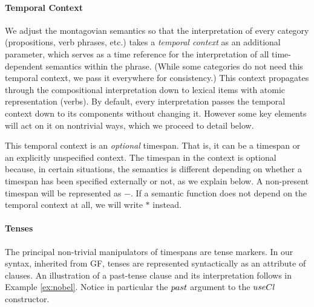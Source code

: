 \documentclass[a4paper,twoside]{article}
\begin{document}
\paragraph{Temporal Context}

We adjust the montagovian semantics so that the interpretation of
every category (propositions, verb phrases, etc.) takes a
\emph{temporal context} as an additional parameter, which serves as a time
reference for the interpretation of all time-dependent semantics
within the phrase. (While some categories do not need this temporal context, we pass it everywhere for consistency.)  This context propagates through the compositional
interpretation down to lexical items with atomic representation
(verbs). By default, every interpretation passes the temporal context
down to its components without changing it. However some key elements
will act on it on nontrivial ways, which we proceed to detail below.

This temporal context is an \emph{optional} timespan. That is, it can
be a timespan or an explicitly unspecified context.
\newcommand\nospan{\ensuremath{-}}
\newcommand\anyspan{\ensuremath{\mathbf{*}}} The timespan in the context is
optional because, in certain situations, the semantics is different
depending on whether a timespan has been specified externally or not,
as we explain below. A non-present timespan will be represented as
\nospan{}. If a semantic function does not depend on the temporal
context at all, we will write \anyspan{} instead.

\paragraph{Tenses}

\newcommand\varid[1]{\mathnormal{#1}}
%
The principal non-trivial manipulators of timespans are tense
markers. In our syntax, inherited from GF, tenses are represented
syntactically as an attribute of clauses. An illustration of a
past-tense clause and its interpretation follows in
Example \ref{ex:nobel}. Notice in particular the $\varid{past}$ argument to
the $\varid{useCl}$ constructor.
\end{document}
